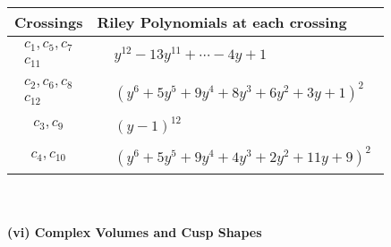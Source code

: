 \documentclass[1p]{elsarticle_modified}
\theoremstyle{definition}
\begin{document}
\begin{tabular}{m{50pt}|m{274pt}}
Crossings & \hspace{64pt}Riley Polynomials at each crossing \\
\hline $$\begin{aligned}c_{1},c_{5},c_{7}\\c_{11}\end{aligned}$$&$\begin{aligned}
&y^{12}-13 y^{11}+\cdots-4 y+1
\end{aligned}$\\
\hline $$\begin{aligned}c_{2},c_{6},c_{8}\\c_{12}\end{aligned}$$&$\begin{aligned}
&(y^6+5 y^5+9 y^4+8 y^3+6 y^2+3 y+1)^2
\end{aligned}$\\
\hline $$\begin{aligned}c_{3},c_{9}\end{aligned}$$&$\begin{aligned}
&(y-1)^{12}
\end{aligned}$\\
\hline $$\begin{aligned}c_{4},c_{10}\end{aligned}$$&$\begin{aligned}
&(y^6+5 y^5+9 y^4+4 y^3+2 y^2+11 y+9)^2
\end{aligned}$\\
\hline
\end{tabular}\\~\\
\newpage\flushleft \textbf{(vi) Complex Volumes and Cusp Shapes}
\end{document}
